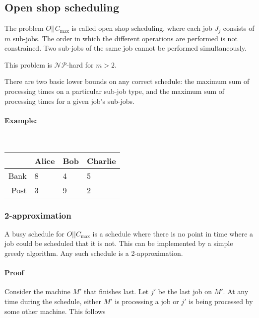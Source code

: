 \documentclass{idc_msc}
\newcommand{\NPclass}{\mathcal{NP}}
\begin{document}

\subsection{Open shop scheduling}

The problem \(O||C_{\max}\) is called open shop scheduling, where each job \(J_j\) consists of \(m\) sub-jobs.
The order in which the different operations are performed is not constrained.
Two sub-jobs of the same job cannot be performed simultaneously.

This problem is \(\NPclass\)-hard for \(m>2\).

There are two basic lower bounds on any correct schedule: the maximum sum of processing times on a particular sub-job type, and the maximum sum of processing times for a given job's sub-jobs.

\paragraph{Example:}\ \\

\begin{center}
\begin{tabu} to \linewidth{|r|l|l|l|}
\hline
& Alice & Bob & Charlie \\
\hline
Bank & 8 & 4 & 5 \\
\hline
Post & 3 & 9 & 2 \\
\hline
\end{tabu}
\end{center}

\subsubsection{2-approximation}

A busy schedule for \(O||C_{\max}\) is a schedule where there is no point in time where a job could be scheduled that it is not.
This can be implemented by a simple greedy algorithm.
Any such schedule is a 2-approximation.

\paragraph{Proof}

Consider the machine \(M'\) that finishes last. Let \(j'\) be the last job on \(M'\). At any time during the schedule, either \(M'\) is processing a job or \(j'\) is being processed by some other machine. This follows 
\end{document}
